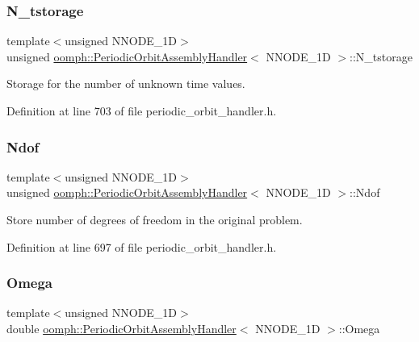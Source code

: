 \subsubsection{\texorpdfstring{N\+\_\+tstorage}{N\_tstorage}}
{\footnotesize\ttfamily template$<$unsigned N\+N\+O\+D\+E\+\_\+1D$>$ \\
unsigned \hyperlink{classoomph_1_1PeriodicOrbitAssemblyHandler}{oomph\+::\+Periodic\+Orbit\+Assembly\+Handler}$<$ N\+N\+O\+D\+E\+\_\+1D $>$\+::N\+\_\+tstorage\hspace{0.3cm}{\ttfamily [private]}}



Storage for the number of unknown time values. 



Definition at line 703 of file periodic\+\_\+orbit\+\_\+handler.\+h.

\mbox{\label{classoomph_1_1PeriodicOrbitAssemblyHandler_aa04e0d8d17e69d64d53df7f9d7369fad}} 
\subsubsection{\texorpdfstring{Ndof}{Ndof}}
{\footnotesize\ttfamily template$<$unsigned N\+N\+O\+D\+E\+\_\+1D$>$ \\
unsigned \hyperlink{classoomph_1_1PeriodicOrbitAssemblyHandler}{oomph\+::\+Periodic\+Orbit\+Assembly\+Handler}$<$ N\+N\+O\+D\+E\+\_\+1D $>$\+::Ndof\hspace{0.3cm}{\ttfamily [private]}}



Store number of degrees of freedom in the original problem. 



Definition at line 697 of file periodic\+\_\+orbit\+\_\+handler.\+h.

\mbox{\label{classoomph_1_1PeriodicOrbitAssemblyHandler_ae922867706dcf2e79e837bbbe774e053}} 
\subsubsection{\texorpdfstring{Omega}{Omega}}
{\footnotesize\ttfamily template$<$unsigned N\+N\+O\+D\+E\+\_\+1D$>$ \\
double \hyperlink{classoomph_1_1PeriodicOrbitAssemblyHandler}{oomph\+::\+Periodic\+Orbit\+Assembly\+Handler}$<$ N\+N\+O\+D\+E\+\_\+1D $>$\+::Omega\hspace{0.3cm}{\ttfamily [private]}}



